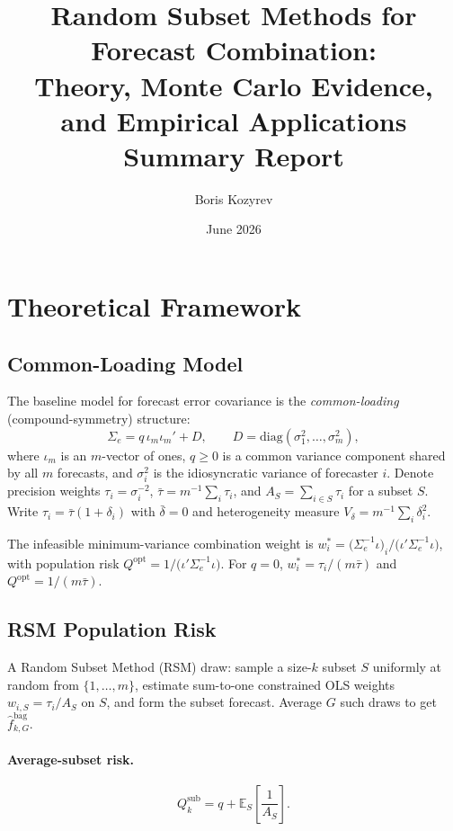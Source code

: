 \documentclass[12pt,a4paper]{article}
\title{\textbf{Random Subset Methods for Forecast Combination:\\
Theory, Monte Carlo Evidence, and Empirical Applications}\\[0.5em]
\large Summary Report}
\author{Boris Kozyrev}
\date{June 2026}
\begin{document}
\maketitle
\tableofcontents
\newpage

\section{Theoretical Framework}

\subsection{Common-Loading Model}

The baseline model for forecast error covariance is the \emph{common-loading}
(compound-symmetry) structure:
\begin{equation}
\Sigma_e = q\,\iota_m\iota_m' + D, \qquad
D = \mathrm{diag}(\sigma_1^2,\ldots,\sigma_m^2),
\end{equation}
where $\iota_m$ is an $m$-vector of ones, $q \geq 0$ is a common variance
component shared by all $m$ forecasts, and $\sigma_i^2$ is the idiosyncratic
variance of forecaster $i$. Denote precision weights $\tau_i = \sigma_i^{-2}$,
$\bar\tau = m^{-1}\sum_i \tau_i$, and $A_S = \sum_{i\in S}\tau_i$ for a
subset $S$. Write $\tau_i = \bar\tau(1+\delta_i)$ with $\bar\delta=0$
and heterogeneity measure $V_\delta = m^{-1}\sum_i\delta_i^2$.

The infeasible minimum-variance combination weight is
$w^*_i = \bigl(\Sigma_e^{-1}\iota\bigr)_i\big/\bigl(\iota'\Sigma_e^{-1}\iota\bigr)$,
with population risk
$Q^{\mathrm{opt}} = 1/\bigl(\iota'\Sigma_e^{-1}\iota\bigr)$.
For $q=0$, $w^*_i = \tau_i/(m\bar\tau)$ and $Q^{\mathrm{opt}} = 1/(m\bar\tau)$.

\subsection{RSM Population Risk}

A Random Subset Method (RSM) draw: sample a size-$k$ subset $S$ uniformly at
random from $\{1,\ldots,m\}$, estimate sum-to-one constrained OLS weights
$w_{i,S} = \tau_i/A_S$ on $S$, and form the subset forecast. Average $G$
such draws to get $\hat f^{\mathrm{bag}}_{k,G}$.

\paragraph{Average-subset risk.}
\begin{equation}\label{eq:Qsub}
Q_k^{\mathrm{sub}} = q + \mathbb{E}_S\!\left[\frac{1}{A_S}\right].
\end{equation}
\end{document}
